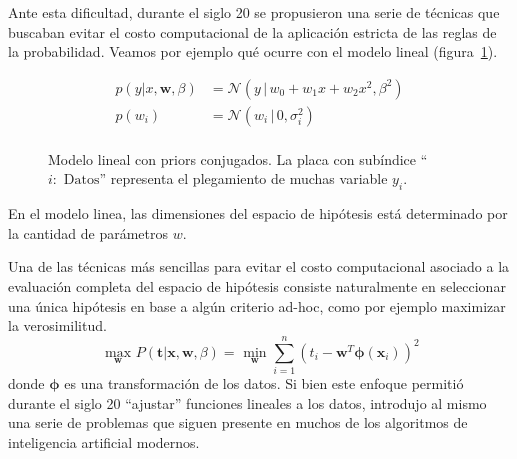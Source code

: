 \documentclass[a4paper,11pt]{book}
\newcommand{\N}{\mathcal{N}}
\theoremstyle{definition}
\begin{document}
Ante esta dificultad, durante el siglo 20 se propusieron una serie de técnicas que buscaban evitar el costo computacional de la aplicación estricta de las reglas de la probabilidad.
%
Veamos por ejemplo qué ocurre con el modelo lineal (figura~\ref{fig:modelo_lineal}).
%
\begin{figure}[ht!]
    \centering
    \begin{subfigure}[c]{0.45\textwidth}
      \begin{equation*}
      \begin{split}
      p(y | x, \bm{w}, \beta ) &= \N(y \,|\, w_0 + w_1 x + w_2 x^2, \beta^2) \\[0cm]
      p(w_i) &= \N(w_i \,|\, 0, \sigma_{i}^2) \\[0cm]
      \end{split}
      \end{equation*}
    \end{subfigure}
    \begin{subfigure}[c]{0.45\textwidth}
    \centering
    \end{subfigure}
    \caption{Modelo lineal con priors conjugados. La placa con subíndice ``$i:\text{ Datos}$'' representa el plegamiento de muchas variable $y_i$.}
    \label{fig:modelo_lineal}
\end{figure}
%
En el modelo linea, las dimensiones del espacio de hipótesis está determinado por la cantidad de parámetros $w$.


Una de las técnicas más sencillas para evitar el costo computacional asociado a la evaluación completa del espacio de hipótesis consiste naturalmente en seleccionar una única hipótesis en base a algún criterio ad-hoc, como por ejemplo maximizar la verosimilitud.
%
\begin{equation*}
 \underset{\bm{w}}{\text{ max }} P(\bm{t} | \bm{x}, \bm{w}, \beta) = \underset{\bm{w}}{\text{ min }} \sum_{i=1}^{n}  (t_i - \bm{w}^T\bm{\phi}(\bm{x}_i))^2
\end{equation*}
%
donde $\bm{\phi}$ es una transformación de los datos.
%
Si bien este enfoque permitió durante el siglo 20 ``ajustar'' funciones lineales a los datos, introdujo al mismo una serie de problemas que siguen presente en muchos de los algoritmos de inteligencia artificial modernos.
\end{document}
